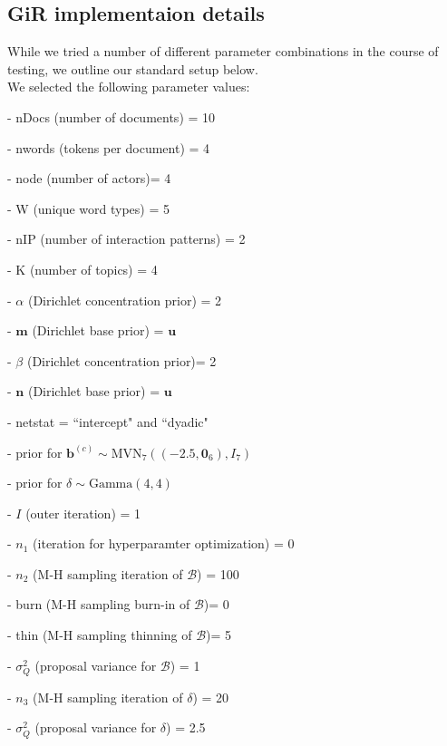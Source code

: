 \documentclass[a4paper]{article}
\begin{document}
   \subsection{GiR implementaion details} \label{subsubsec: GiR implementation}
   While we tried a number of different parameter combinations in the course of testing, we outline our standard setup below.\\ \newline
   We selected the following parameter values:
   \begin{itemize}
   	\begin{minipage}{0.5\textwidth}
   		\item[-] nDocs (number of documents) = 10
   		\item[-] nwords (tokens per document) = 4
   		\item[-] node (number of actors)= 4
   		\item[-] W (unique word types) = 5
   		\item[-] nIP (number of interaction patterns) = 2
   		\item[-] K (number of topics) = 4
   		\item[-] $\alpha$ (Dirichlet concentration prior) = 2
   		\item[-] $\boldsymbol{m}$ (Dirichlet base prior) = $\boldsymbol{u}$ 
   		\item[-] $\beta$ (Dirichlet concentration prior)= 2
   		\item[-] $\boldsymbol{n}$ (Dirichlet base prior) = $\boldsymbol{u}$
   		\item[-] netstat = ``intercept" and ``dyadic"
   	\end{minipage}
   	\begin{minipage}{0.5\textwidth}
   		\item[-] prior for $\boldsymbol{b}^{(c)}\sim \mbox{MVN}_7((-2.5,\boldsymbol{0}_6), I_7)$
   		\item[-] prior for $\delta\sim \mbox{Gamma}(4, 4)$
   		\item[-] $I$ (outer iteration) = 1
   		\item[-] $n_1$ (iteration for hyperparamter optimization) = 0
   		\item[-] $n_2$ (M-H sampling iteration of $\mathcal{B}$) = 100
   		\item[-] burn (M-H sampling burn-in of $\mathcal{B}$)= 0
   		\item[-] thin (M-H sampling thinning of $\mathcal{B}$)= 5
   		\item[-] $\sigma_Q^2$ (proposal variance for $\mathcal{B}$) = 1
   		\item[-] $n_3$ (M-H sampling iteration of $\delta$) = 20
   		\item[-] $\sigma_Q^2$ (proposal variance for $\delta$) = 2.5
   	\end{minipage}
   \end{itemize}
\end{document}
